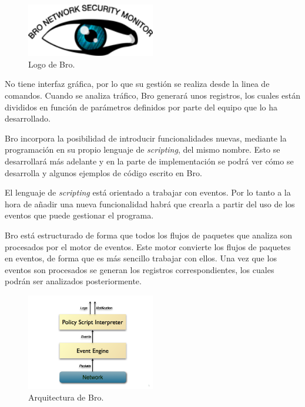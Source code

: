 \begin{figure}[H]
  \includegraphics[width=0.5\textwidth]{imagenes/logo-bro.png}
  \centering
  \caption{Logo de Bro.}
\end{figure}

\intro No tiene interfaz gráfica, por lo que su gestión se realiza desde la linea de comandos. Cuando se analiza 
tráfico, Bro generará unos registros, los cuales están divididos en función de parámetros definidos por parte del 
equipo que lo ha desarrollado.

\intro Bro incorpora la posibilidad de introducir funcionalidades nuevas, mediante la programación en su 
propio lenguaje de \textit{scripting}, del mismo nombre. Esto se desarrollará más adelante y en la 
parte de implementación se podrá ver cómo se desarrolla y algunos ejemplos de código escrito en Bro.

\intro El lenguaje de \textit{scripting} está orientado a trabajar con eventos. Por lo tanto a la hora de añadir una nueva funcionalidad habrá que crearla a partir del uso de los eventos que puede gestionar el programa.

\intro \noindent Bro está estructurado de forma que todos los flujos de paquetes que analiza son procesados por el motor de eventos. Este motor convierte los flujos de paquetes en eventos, de forma que es más sencillo trabajar con ellos. 
Una vez que los eventos son procesados se generan los registros correspondientes, los cuales podrán ser analizados posteriormente. \cite{broarquitectura}

\begin{figure}[H]
  \includegraphics[width=0.5\textwidth]{imagenes/arquitectura-bro.png}
  \centering
  \caption{Arquitectura de Bro.}
\end{figure}

